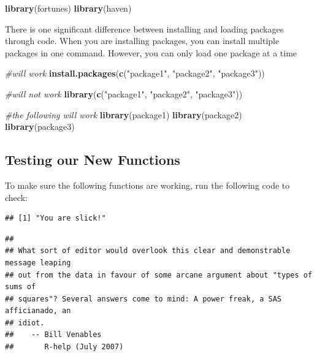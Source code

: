\documentclass[
]{book}
\newenvironment{Shaded}{\begin{snugshade}}{\end{snugshade}}
\newcommand{\CommentTok}[1]{\textcolor[rgb]{0.56,0.35,0.01}{\textit{#1}}}
\newcommand{\FunctionTok}[1]{\textcolor[rgb]{0.13,0.29,0.53}{\textbf{#1}}}
\newcommand{\NormalTok}[1]{#1}
\newcommand{\StringTok}[1]{\textcolor[rgb]{0.31,0.60,0.02}{#1}}
\begin{document}
\begin{Shaded}
\begin{Highlighting}[]
\FunctionTok{library}\NormalTok{(fortunes)}
\FunctionTok{library}\NormalTok{(haven)}
\end{Highlighting}
\end{Shaded}

There is one significant difference between installing and loading packages through code. When you are installing packages, you can install multiple packages in one command. However, you can only load one package at a time

\begin{Shaded}
\begin{Highlighting}[]
\CommentTok{\#will work}
\FunctionTok{install.packages}\NormalTok{(}\FunctionTok{c}\NormalTok{(}\StringTok{"package1"}\NormalTok{, }\StringTok{"package2"}\NormalTok{, }\StringTok{"package3"}\NormalTok{)) }


\CommentTok{\#will not work}
\FunctionTok{library}\NormalTok{(}\FunctionTok{c}\NormalTok{(}\StringTok{"package1"}\NormalTok{, }\StringTok{"package2"}\NormalTok{, }\StringTok{"package3"}\NormalTok{)) }

\CommentTok{\#the following will work}
\FunctionTok{library}\NormalTok{(package1)}
\FunctionTok{library}\NormalTok{(package2)}
\FunctionTok{library}\NormalTok{(package3)}
\end{Highlighting}
\end{Shaded}

\hypertarget{testing-our-new-functions}{%
\subsection{Testing our New Functions}\label{testing-our-new-functions}}

To make sure the following functions are working, run the following code to check:

\begin{verbatim}
## [1] "You are slick!"
\end{verbatim}

\begin{verbatim}
## 
## What sort of editor would overlook this clear and demonstrable message leaping
## out from the data in favour of some arcane argument about "types of sums of
## squares"? Several answers come to mind: A power freak, a SAS afficianado, an
## idiot.
##    -- Bill Venables
##       R-help (July 2007)
\end{verbatim}
\end{document}
